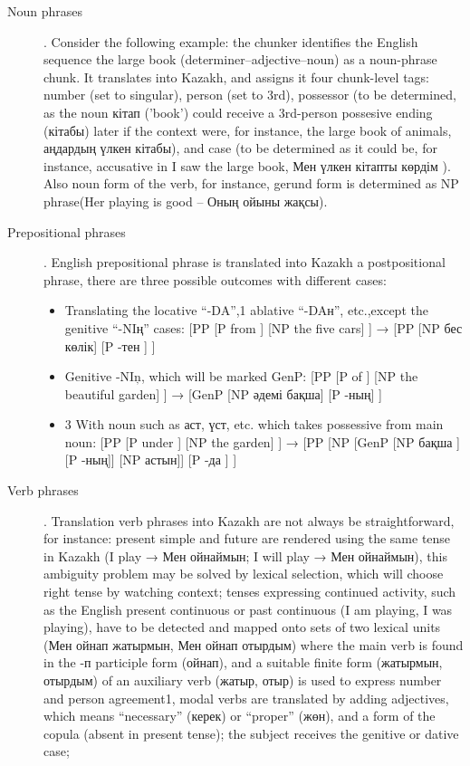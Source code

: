 \documentclass[11pt]{article}
\begin{document}
\begin{itemize}
\begin{description}
\item[Noun phrases]. Consider the following example: the chunker identifies the English sequence the large book  (determiner–adjective–noun) as a noun-phrase chunk. It translates into Kazakh, and assigns it four chunk-level tags: number (set to singular), person (set to 3rd), possessor (to be determined, as the noun кітап ('book') could receive a 3rd-person possesive ending (кітабы) later if the context were, for instance, the large book of animals, аңдардың үлкен кітабы), and case (to be determined as it could be, for instance, accusative in I saw the large book, Мен үлкен кітапты көрдім ). Also noun form of the verb, for instance,  gerund form is determined as NP phrase(Her playing is good – Оның ойыны жақсы).
\item[Prepositional phrases]. English prepositional phrase is translated into Kazakh a postpositional phrase, there are three possible outcomes with different cases:
\begin{itemize}
\item Translating the locative “-{D}{A}”,1 ablative “-{D}{A}н”, etc.,except the genitive “-{N}{I}ң” cases: [PP [P from ] [NP the five cars] ] → [PP [NP бес көлік] [P -тен ] ]
\item Genitive -NIņ, which will be marked GenP:  [PP [P of ] [NP the beautiful garden] ] → [GenP [NP әдемі бақша] [P -ның] ] 
\item 3 With noun such as аст, үст, etc. which takes possessive from main noun:  [PP [P under ] [NP the garden] ] → [PP [NP [GenP [NP бақша ][P -ның]] [NP астын]] [P -да ] ]
\end{itemize}
\item[Verb phrases]. Translation verb phrases into Kazakh  are not always be straightforward, for instance: 
present simple and future are rendered using the same tense in Kazakh (I play → Мен ойнаймын;  I will play → Мен ойнаймын), this ambiguity problem may be solved by lexical selection, which will choose right tense by watching context; 
tenses expressing continued activity, such as the English present continuous or past continuous (I am playing, I was playing), have to be detected and mapped onto sets of two lexical units (Мен ойнап жатырмын, Мен ойнап отырдым) where the main verb is found in the -п participle form (ойнап), and a suitable finite form  (жатырмын, отырдым) of an auxiliary verb (жатыр, отыр) is used to express number and person agreement1, 
modal verbs are translated by adding adjectives, which means “necessary” (керек) or “proper” (жөн), and a form of the copula (absent in present tense); the subject receives the genitive or dative case;

\end{description}
\end{itemize}
\end{document}
